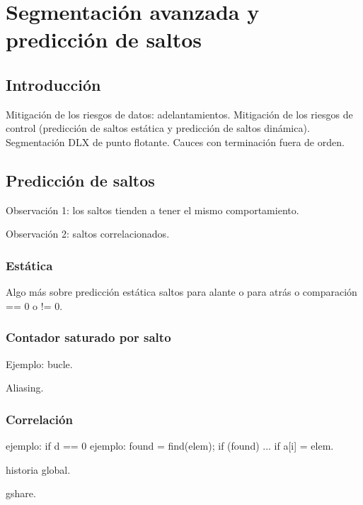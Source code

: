 \documentclass[12pt,onecolumn]{memoir}
\begin{document}

\chapter{Segmentación avanzada y predicción de saltos}
\label{cap:avanzada}


\section{Introducción}
\label{sec:introduccion_avanzada}

Mitigación de los riesgos de datos: adelantamientos. Mitigación de los riesgos de control (predicción de saltos estática y predicción de saltos dinámica). Segmentación DLX de punto flotante. Cauces con terminación fuera de orden.

\section{Predicción de saltos}

Observación 1: los saltos tienden a tener el mismo comportamiento.

Observación 2: saltos correlacionados.

\subsection{Estática}

Algo más sobre predicción estática saltos para alante o para atrás o comparación == 0 o != 0.

\subsection{Contador saturado por salto}

Ejemplo: bucle.

Aliasing.

\subsection{Correlación}

ejemplo: if d == 0
ejemplo: found = find(elem); if (found) ...  if a[i] = elem.

historia global.

gshare.

\end{document}
